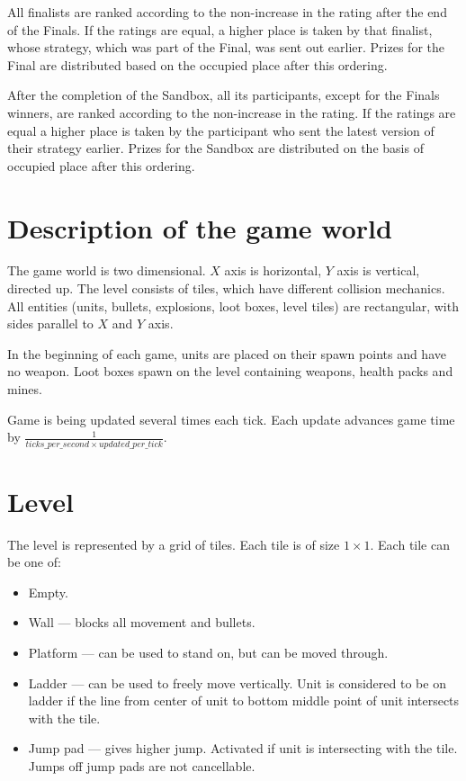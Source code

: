 All finalists are ranked according to the non-increase in the rating after the end of the Finals. If the ratings are equal, a higher place is taken by that finalist, whose strategy, which was part of the Final, was sent out earlier. Prizes for the Final are distributed based on the occupied place after this
ordering.

After the completion of the Sandbox, all its participants, except for the Finals winners, are ranked according to the non-increase in the rating. If the ratings are equal 
a higher place is taken by the participant who sent the latest version of their strategy earlier. Prizes for the Sandbox are distributed on the basis of
occupied place after this ordering.

\section{Description of the game world}

The game world is two dimensional.
$X$ axis is horizontal, $Y$ axis is vertical, directed up.
The level consists of tiles, which have different collision mechanics.
All entities (units, bullets, explosions, loot boxes, level tiles) are rectangular, with sides parallel to $X$ and $Y$ axis.

In the beginning of each game, units are placed on their spawn points and have no weapon.
Loot boxes spawn on the level containing weapons, health packs and mines.

Game is being updated several times each tick.
Each update advances game time by $\frac{1}{ticks\_per\_second \times updated\_per\_tick}$.

\section{Level}

The level is represented by a grid of tiles. Each tile is of size $1 \times 1$. Each tile can be one of:
\begin{itemize}
      \item Empty.
      \item Wall --- blocks all movement and bullets.
      \item Platform --- can be used to stand on, but can be moved through.
      \item Ladder --- can be used to freely move vertically.
            Unit is considered to be on ladder if the line from center of unit to bottom middle point of unit intersects with the tile.
      \item Jump pad --- gives higher jump. Activated if unit is intersecting with the tile.
            Jumps off jump pads are not cancellable.
\end{itemize}

